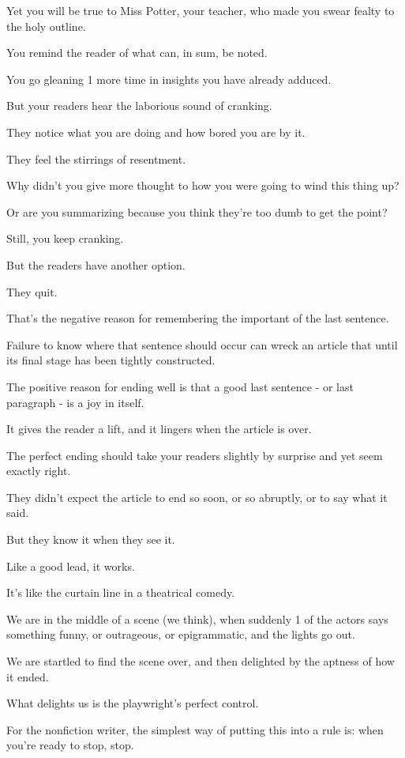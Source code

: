 \documentclass{book}
\numberwithin{equation}{section}
\begin{document}
Yet you will be true to Miss Potter, your teacher, who made you swear fealty to the holy outline.

You remind the reader of what can, in sum, be noted.

You go gleaning 1 more time in insights you have already adduced.

%
But your readers hear the laborious sound of cranking.

They notice what you are doing and how bored you are by it.

They feel the stirrings of resentment.

Why didn't you give more thought to how you were going to wind this thing up?

Or are you summarizing because you think they're too dumb to get the point?

Still, you keep cranking.

But the readers have another option.

They quit.

%
That's the negative reason for remembering the important of the last sentence.

Failure to know where that sentence should occur can wreck an article that until its final stage has been tightly constructed.

The positive reason for ending well is that a good last sentence - or last paragraph - is a joy in itself.

It gives the reader a lift, and it lingers when the article is over.

%
The perfect ending should take your readers slightly by surprise and yet seem exactly right.

They didn't expect the article to end so soon, or so abruptly, or to say what it said.

But they know it when they see it.

Like a good lead, it works.

It's like the curtain line in a theatrical comedy.

We are in the middle of a scene (we think), when suddenly 1 of the actors says something funny, or outrageous, or epigrammatic, and the lights go out.

We are startled to find the scene over, and then delighted by the aptness of how it ended.

What delights us is the playwright's perfect control.

%
For the nonfiction writer, the simplest way of putting this into a rule is: when you're ready to stop, stop.
\end{document}
